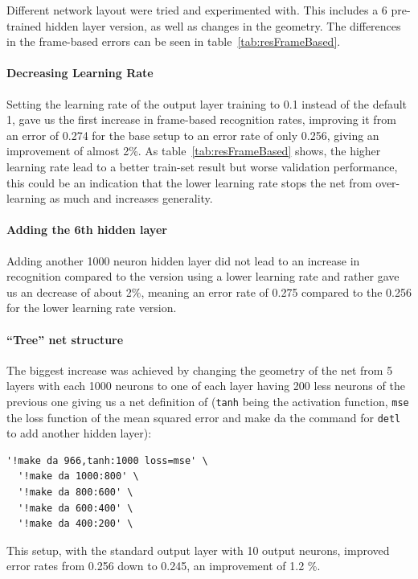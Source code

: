 Different network layout were tried and experimented with. This includes a 6 pre-trained hidden layer version, as well as changes in the geometry. The differences in the frame-based errors can be seen in table~\ref{tab:resFrameBased}. 

\paragraph{Decreasing Learning Rate} Setting the learning rate of the output layer training to 0.1 instead of the default 1, gave us the first increase in frame-based recognition rates, improving it from an error of 0.274 for the base setup to an error rate of only 0.256, giving an improvement of almost 2\%. As table~\ref{tab:resFrameBased} shows, the higher learning rate lead to a better train-set result but worse validation performance, this could be an indication that the lower learning rate stops the net from over-learning as much and increases generality.

\paragraph{Adding the 6th hidden layer} Adding another 1000 neuron hidden layer did not lead to an increase in recognition compared to the version using a lower learning rate and rather gave us an decrease of about 2\%, meaning an error rate of 0.275 compared to the 0.256 for the lower learning rate version.

\paragraph{``Tree'' net structure} The biggest increase was achieved by changing the geometry of the net from 5 layers with each 1000 neurons to one of each layer having 200 less neurons of the previous one giving us a net definition of (\texttt{tanh} being the activation function, \texttt{mse} the loss function of the mean squared error and make da the command for \texttt{detl} to add another hidden layer):

\begin{verbatim}'!make da 966,tanh:1000 loss=mse' \
  '!make da 1000:800' \
  '!make da 800:600' \
  '!make da 600:400' \
  '!make da 400:200' \
\end{verbatim}

This setup, with the standard output layer with 10 output neurons, improved error rates from 0.256 down to 0.245, an improvement of 1.2 \%.

